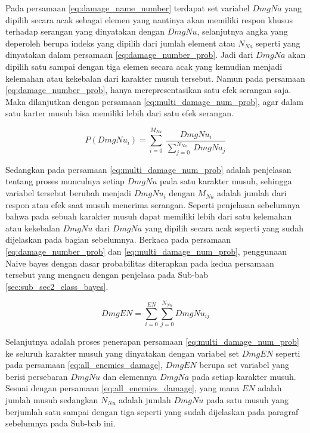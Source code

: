 Pada persamaan \ref{eq:damage_name_number} terdapat set variabel $DmgNa$ yang dipilih secara acak sebagai elemen yang nantinya akan memiliki respon khusus terhadap serangan yang dinyatakan dengan $DmgNu$, selanjutnya angka yang deperoleh berupa indeks yang dipilih dari jumlah element atau $N_{Na}$ seperti yang dinyatakan dalam persamaan \ref{eq:damage_number_prob}. Jadi dari $DmgNa$ akan dipilih satu sampai dengan tiga elemen secara acak yang kemudian menjadi kelemahan atau kekebalan dari karakter musuh tersebut. Namun pada persamaan \ref{eq:damage_number_prob}, hanya merepresentasikan satu efek serangan saja. Maka dilanjutkan dengan persamaan \ref{eq:multi_damage_num_prob}, agar dalam satu karter musuh bisa memiliki lebih dari satu efek serangan.

\begin{equation}\label{eq:multi_damage_num_prob}
P(DmgNu_{i}) = \sum_{i = 0}^{M_{Nu}}\ \frac{DmgNu_{i}}{\sum_{j = 0}^{N_{Na}}\ DmgNa_{j}}
\end{equation}

Sedangkan pada persamaan \ref{eq:multi_damage_num_prob} adalah penjelasan tentang proses munculnya setiap $DmgNu$ pada satu karakter musuh, sehingga variabel tersebut berubah menjadi $DmgNu_{i}$ dengan $M_{Nu}$ adalah jumlah dari respon atau efek saat musuh menerima serangan. Seperti penjelasan sebelumnya bahwa pada sebuah karakter musuh dapat memiliki lebih dari satu kelemahan atau kekebalan $DmgNu$ dari $DmgNa$ yang dipilih secara acak seperti yang sudah dijelaskan pada bagian sebelumnya. Berkaca pada persamaan \ref{eq:damage_number_prob} dan \ref{eq:multi_damage_num_prob}, penggunaan Naive bayes dengan dasar probabilitas diterapkan pada kedua persamaan tersebut yang mengacu dengan penjelasa pada Sub-bab \ref{sec:sub_sec2_class_bayes}.
\vspace{1ex}

\begin{equation}\label{eq:all_enemies_damage}
DmgEN = \sum_{i = 0}^{EN}\sum_{j = 0}^{N_{Nu}} DmgNu_{ij}
\end{equation}

Selanjutnya adalah proses penerapan persamaan \ref{eq:multi_damage_num_prob} ke seluruh karakter musuh yang dinyatakan dengan variabel set $DmgEN$ seperti pada persamaan \ref{eq:all_enemies_damage}, $DmgEN$ berupa set variabel yang berisi persebaran $DmgNu$ dan elemennya $DmgNa$ pada setiap karakter musuh. Sesuai dengan persamaan \ref{eq:all_enemies_damage}, yang mana $EN$ adalah jumlah musuh sedangkan $N_{Nu}$ adalah jumlah $DmgNu$ pada satu musuh yang berjumlah satu sampai dengan tiga seperti yang sudah dijelaskan pada paragraf sebelumnya pada Sub-bab ini.
\vspace{1ex}

